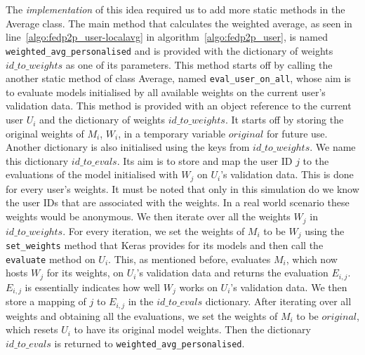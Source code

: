 \documentclass[12pt]{article}
\begin{document}
\\\\
The \textit{implementation} of this idea required us to add more static methods in the Average class. The main method that calculates the weighted average, as seen in line~\ref{algo:fedp2p_user-localavg} in algorithm~\ref{algo:fedp2p_user}, is named \texttt{weighted\_avg\_personalised} and is provided with the dictionary of weights $id\_to\_weights$ as one of its parameters. This method starts off by calling the another static method of class Average, named \texttt{eval\_user\_on\_all}, whose aim is to evaluate models initialised by all available weights on the current user's validation data. This method is provided with an object reference to the current user $U_i$ and the dictionary of weights $id\_to\_weights$. It starts off by storing the original weights of $M_i$, $W_i$, in a temporary  variable $original$ for future use. Another dictionary is also initialised using the keys from $id\_to\_weights$. We name this dictionary $id\_to\_evals$. Its aim is to store and map the user ID $j$ to the evaluations of the model initialised with $W_j$ on $U_i$'s validation data. This is done for every user's weights. It must be noted that only in this simulation do we know the user IDs that are associated with the weights. In a real world scenario these weights would be anonymous. We then iterate over all the weights $W_j$ in $id\_to\_weights$. For every iteration, we set the weights of $M_i$ to be $W_j$ using the \texttt{set\_weights} method that Keras provides for its models and then call the \texttt{evaluate} method on $U_i$. This, as mentioned before, evaluates $M_i$, which now hosts $W_j$ for its weights, on $U_i$'s validation data and returns the evaluation $E_{i,j}$. $E_{i,j}$ is essentially indicates how well $W_j$ works on $U_i$'s validation data. We then store a mapping of $j$ to $E_{i,j}$ in the $id\_to\_evals$ dictionary. After iterating over all weights and obtaining all the evaluations, we set the weights of $M_i$ to be $original$, which resets $U_i$ to have its original model weights. Then the dictionary $id\_to\_evals$ is returned to \texttt{weighted\_avg\_personalised}.
\\\\
\end{document}
